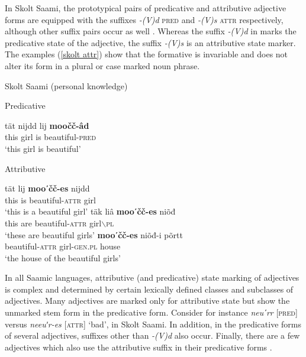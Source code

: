 In Skolt Saami, the prototypical pairs of predicative and attributive adjective forms are equipped with the suffixes \textit{-(V)d} \textsc{pred} and \textit{-(V)s} \textsc{attr} respectively, although other suffix pairs occur as well \citep[173–176]{feist2015a}. Whereas the suffix \textit{-(V)d} in  marks the predicative state of the adjective, the suffix \mbox{\textit{-(V)s}} is an attributive state marker. The examples (\ref{skolt attr}) show that the formative is invariable and does not alter its form in a plural or case marked noun phrase.
\begin{exe}
\ex \rm{Skolt Saami (personal knowledge)}
\begin{xlist}
\ex
\label{skolt pred}
\rm{Predicative}
\begin{xlist}
\gll	tät nijdd lij \textbf{moočč-âd}\\
	this girl is beautiful-\textsc{pred}\\
\glt	‘this girl is beautiful’
\end{xlist}
\ex
\label{skolt attr}
\rm{Attributive} 
\begin{xlist}
\ex
\gll 	tät lij \textbf{mooʹčč-es} nijdd\\
	this is beautiful-\textsc{attr} girl\\
\glt	‘this is a beautiful girl’
\ex	
\gll	täk liâ \textbf{mooʹčč-es} niõđ\\
	this are beautiful-\textsc{attr} girl$\backslash$\textsc{pl}\\
\glt	‘these are beautiful girls’
\ex	
\gll	\textbf{mooʹčč-es} niõđ-i põrtt\\
	beautiful-\textsc{attr} girl-\textsc{gen.pl} house\\
\glt	‘the house of the beautiful girls’
\end{xlist}
\end{xlist}
\end{exe}
In all Saamic languages, attributive (and predicative) state marking of adjectives is complex and determined by certain lexically defined classes and subclasses of adjectives. Many adjectives are marked only for attributive state but show the unmarked stem form in the predicative form. Consider for instance \textit{neuʹrr} [\textsc{pred}] versus \textit{neeuʹr-es} [\textsc{attr}] ‘bad’, in Skolt Saami. In addition, in the predicative forms of several adjectives, suffixes other than \textit{-(V)d} also occur. Finally, there are a few adjectives which also use the attributive suffix in their predicative forms \citep[cf.][173–176]{feist2015a}.

